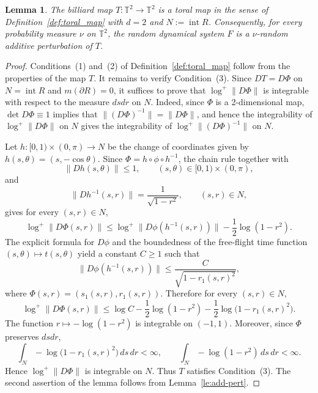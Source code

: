 \documentclass[a4paper,12pt,reqno]{amsart}
\numberwithin{equation}{section}
\newtheorem{lemma}[theorem]{Lemma}
\newcommand{\Tt}{{\mathbb{T}}}
\begin{document}
\begin{lemma}
\label{lemma:0}
The billiard map $T\colon\Tt^2\to\Tt^2$ is a toral map in the sense of Definition~\ref{def:toral_map} with $d=2$ and $N:=\operatorname{int}R$. Consequently, for every probability measure $\nu$ on $\Tt^2$, the random dynamical system $F$ is a $\nu$-random additive perturbation of $T$.
\end{lemma}

\begin{proof}
Conditions~(1) and~(2) of Definition~\ref{def:toral_map} follow from the  properties of the map $T$. It remains to verify Condition~(3). Since $DT=D\Phi$ on $N=\operatorname{int}R$ and $m(\partial R)=0$, it suffices to prove that $\log^+\|D\Phi\|$ is integrable with respect to the measure $dsdr$ on $N$. Indeed, since $\Phi$ is a 2-dimensional map, $\det D\Phi \equiv 1$ implies that $\|(D\Phi)^{-1}\|=\|D\Phi\|$, and hence the integrability of $\log^+ \|D\Phi\|$ on $N$ gives the integrability of $\log^+ \|(D\Phi)^{-1}\|$ on $N$. 

Let  $h \colon [0,1) \times (0,\pi) \to N$ be the change of coordinates given by $h(s,\theta)= (s,-\cos \theta)$. Since $\Phi = h \circ \phi \circ h^{-1}$, the chain rule together with
\[
\|Dh(s,\theta)\|\leq 1, \qquad (s,\theta) \in [0,1) \times (0,\pi),
\]
and
\[
\|Dh^{-1}(s,r)\|=\frac{1}{\sqrt{1-r^2}}, \qquad (s,r) \in N,
\]
gives for every $(s,r) \in N$,
\[
\log^+\|D\Phi(s,r)\|
\leq
\log^+\|D\phi(h^{-1}(s,r))\|
-\frac12\log(1-r^2).
\]
The explicit formula for $D\phi$ and the boundedness of the free-flight time function $(s,\theta) \mapsto t(s,\theta)$ yield a constant $C\geq 1$ such that
\[
\|D\phi(h^{-1}(s,r))\|
\leq
\frac{C}{\sqrt{1-r_1(s,r)^2}},
\]
where $\Phi(s,r)=(s_1(s,r),r_1(s,r))$. Therefore for every $(s,r) \in N$,
\[
\log^+\|D\Phi(s,r)\|
\leq
\log C-\frac12\log(1-r^2)
-\frac12\log\bigl(1-r_1(s,r)^2\bigr).
\]
The function $r\mapsto-\log(1-r^2)$ is integrable on $(-1,1)$. Moreover, since $\Phi$ preserves $dsdr$,
\[
\int_N
-\log\bigl(1-r_1(s,r)^2\bigr)\,ds\,dr < \infty, \qquad 
\int_N
-\log(1-r^2)\,ds\,dr<\infty.
\]
Hence $\log^+\|D\Phi\|$ is integrable on $N$. Thus $T$ satisfies Condition~(3). The second assertion of the lemma follows from Lemma~\ref{le:add-pert}.
\end{proof}


\end{document}
